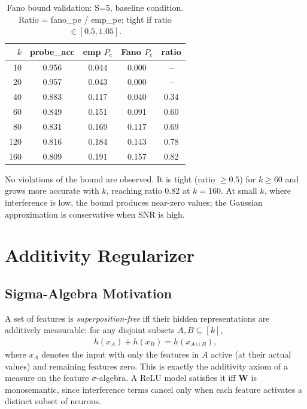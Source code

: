 \documentclass[11pt]{article}
\begin{document}
\begin{table}[t]
\centering
\caption{Fano bound validation: S=5, baseline condition.
         Ratio = fano\_pe / emp\_pe; tight if ratio $\in [0.5, 1.05]$.}
\label{tab:fano}
\begin{tabular}{rcccc}
\toprule
$k$ & probe\_acc & emp $P_e$ & Fano $P_e$ & ratio \\
\midrule
10  & 0.956 & 0.044 & 0.000 & --   \\
20  & 0.957 & 0.043 & 0.000 & --   \\
40  & 0.883 & 0.117 & 0.040 & 0.34 \\
60  & 0.849 & 0.151 & 0.091 & 0.60 \\
80  & 0.831 & 0.169 & 0.117 & 0.69 \\
120 & 0.816 & 0.184 & 0.143 & 0.78 \\
160 & 0.809 & 0.191 & 0.157 & 0.82 \\
\bottomrule
\end{tabular}
\end{table}

No violations of the bound are observed. It is tight (ratio $\geq 0.5$) for $k \geq 60$ and
grows more accurate with $k$, reaching ratio 0.82 at $k = 160$. At small $k$, where interference
is low, the bound produces near-zero values; the Gaussian approximation is conservative when SNR
is high.

\section{Additivity Regularizer}

\subsection{Sigma-Algebra Motivation}

A set of features is \emph{superposition-free} iff their hidden representations are additively
measurable: for any disjoint subsets $A, B \subseteq [k]$,
\begin{align}
    h(x_A) + h(x_B) = h(x_{A \cup B}),
\end{align}
where $x_A$ denotes the input with only the features in $A$ active (at their actual values)
and remaining features zero.
This is exactly the additivity axiom of a measure on the feature $\sigma$-algebra. A ReLU
model satisfies it iff $\mathbf{W}$ is monosemantic, since interference terms cancel only when
each feature activates a distinct subset of neurons.
\end{document}
